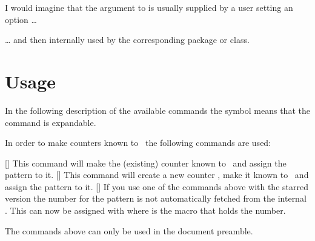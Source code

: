 \documentclass[load-preamble+]{cnltx-doc}
\begin{document}
\begin{example}
\end{example}

I would imagine that the argument to  is usually
supplied by a user setting an option \ldots
\begin{sourcecode}
\end{sourcecode}
\ldots{} and then internally used by the corresponding package or class.


\section{Usage}
In the following description of the available commands the symbol
\textcolor{expandable}{\expandablesign} means that the command is expandable.

In order to make counters known to \cntformats\ the following commands are used:
\begin{commands}
  [\sarg{}]
    This command will make the (existing) counter  known to
    \cntformats\ and assign the pattern  to it.
  [\sarg{}]
    This command will create a new counter , make it known to
    \cntformats\ and assign the pattern  to it.
  []
    If you use one of the commands above with the starred version the number
    for the pattern is not automatically fetched from the internal
    .  This can now be assigned with
      where  is the macro that holds
    the number.
\end{commands}
The commands above can only be used in the document preamble.
\end{document}
